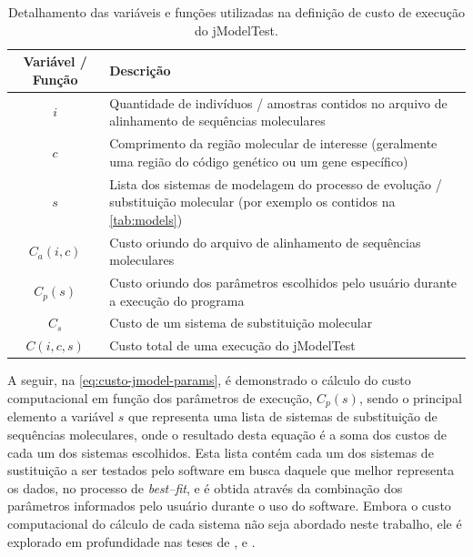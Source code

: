\documentclass[english,brazilian]{UNISINOSmonografia} %
\newcommand\defaultFigureWidth{0.9}
\renewcommand{\arraystretch}{1.3}
\begin{document}
\begin{table}[tb]
\centering%
\begin{minipage}{\defaultFigureWidth\textwidth}
	\caption{Detalhamento das variáveis e funções utilizadas na definição de custo de execução do jModelTest.}
	\label{tab:custo-jmodel-elementos}
	\small
	\vspace{1ex}
	\renewcommand\arraystretch{1.4}
	\renewcommand {\tabularxcolumn}[1]{>{\arraybackslash}m{#1}}
	\begin{tabularx}{\textwidth}{cX@{}}
		\toprule
		Variável / Função & Descrição \\ 
		\midrule
		$ i $ & Quantidade de indivíduos / amostras contidos no arquivo de alinhamento de sequências moleculares \\
		$ c $ & Comprimento da região molecular de interesse (geralmente uma região do código genético ou um gene específico) \\
		$ s $ & Lista dos sistemas de modelagem do processo de evolução / substituição molecular (por exemplo os contidos na \autoref{tab:models}) \\
		$ C_a(i,c) $ & Custo oriundo do arquivo de alinhamento de sequências moleculares \\
		$ C_p(s) $ & Custo oriundo dos parâmetros escolhidos pelo usuário durante a execução do programa \\
		$ C_s $ & Custo de um sistema de substituição molecular \\
		$ C(i,c,s) $ & Custo total de uma execução do jModelTest \\
		\bottomrule	
	\end{tabularx}
\end{minipage}
\end{table}


A seguir, na \autoref{eq:custo-jmodel-params}, é demonstrado o cálculo do custo computacional em função dos parâmetros de execução, $ C_p(s) $, sendo o principal elemento a variável $ s $ que representa uma lista de sistemas de substituição de sequências moleculares, onde o resultado desta equação é a soma dos custos de cada um dos sistemas escolhidos. 
Esta lista contém cada um dos sistemas de sustituição a ser testados pelo software em busca daquele que melhor representa os dados, no processo de \textit{best--fit}, e é obtida através da combinação dos parâmetros informados pelo usuário durante o uso do software.
Embora o custo computacional do cálculo de cada sistema não seja abordado neste trabalho, ele é explorado em profundidade nas teses de ,  e .
\end{document}
